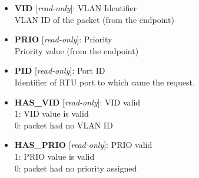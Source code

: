 \vspace{12pt}
\noindent
{}

\begin{itemize}
\item \begin{small}
{\bf 
VID
} [\emph{read-only}]: VLAN Identifier
\\
VLAN ID of the packet (from the endpoint)
\end{small}
\item \begin{small}
{\bf 
PRIO
} [\emph{read-only}]: Priority
\\
Priority value (from the endpoint)
\end{small}
\item \begin{small}
{\bf 
PID
} [\emph{read-only}]: Port ID
\\
Identifier of RTU port to which came the request.
\end{small}
\item \begin{small}
{\bf 
HAS\_VID
} [\emph{read-only}]: VID valid
\\
1: VID value is valid\\                       0: packet had no VLAN ID
\end{small}
\item \begin{small}
{\bf 
HAS\_PRIO
} [\emph{read-only}]: PRIO valid
\\
1: PRIO value is valid\\                       0: packet had no priority assigned
\end{small}
\end{itemize}
